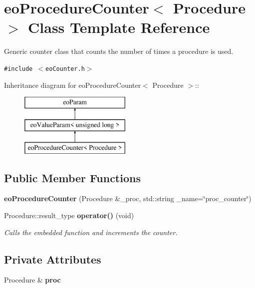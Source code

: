 \section{eo\-Procedure\-Counter$<$ Procedure $>$ Class Template Reference}
\label{classeo_procedure_counter}
Generic counter class that counts the number of times a procedure is used.  


{\tt \#include $<$eo\-Counter.h$>$}

Inheritance diagram for eo\-Procedure\-Counter$<$ Procedure $>$::\begin{figure}[H]
\begin{center}
\leavevmode
\includegraphics[height=3cm]{classeo_procedure_counter}
\end{center}
\end{figure}
\subsection*{Public Member Functions}
\begin{CompactItemize}
\item 
{\bf eo\-Procedure\-Counter} (Procedure \&\_\-proc, std::string \_\-name=\char`\"{}proc\_\-counter\char`\"{})\label{classeo_procedure_counter_a0}

\item 
Procedure::result\_\-type {\bf operator()} (void)
\begin{CompactList}\small\item\em Calls the embedded function and increments the counter. \item\end{CompactList}\end{CompactItemize}
\subsection*{Private Attributes}
\begin{CompactItemize}
\item 
Procedure \& {\bf proc}\label{classeo_procedure_counter_r0}

\end{CompactItemize}


